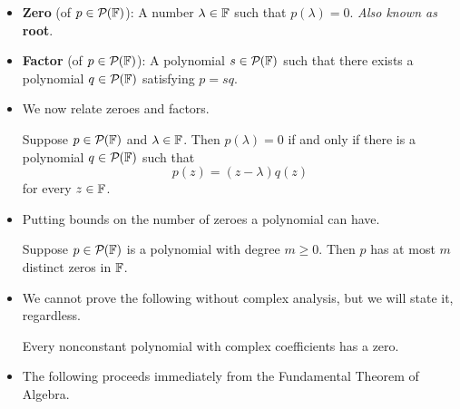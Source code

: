 \documentclass[../main.tex]{subfiles}
\begin{document}
\begin{itemize}
\begin{theorem}
\begin{proof}
\begin{align*}
                \dim\range T &= \dim(\pol[n-m]{\F}\times\pol[m-1]{\F})-\dim\nul T\\
                &= n+1\\
                &= \dim\pol[n]{\F}
            \end{align*}
            Thus, by Exercise \ref{exr:subspaceSameDim}, $\range T=\pol[n]{\F}$. Therefore, since $p\in\pol[n]{\F}$, we know that there exists $q\in\pol[n-m]{\F}$ and $r\in\pol[m-1]{\F}$ such that $p=T(q,r)=sq+r$.\par
            Additionally, we know that $q,r$ are unique: If there exist $q',r'$ such that $T(q',r')=p$, then $T(q-q',r-r')=p-p=0$, implying since $\nul T=\{(0,0)\}$ that $q-q'=0$ and $r-r'=0$, i.e., that $q=q'$ and $r=r'$.
        \end{proof}
    \end{theorem}
    \item \textbf{Zero} (of $p\in\mathcal{P}_{}(\mathbb{F})$): A number $\lambda\in\mathbb{F}$ such that $p(\lambda)=0$. \emph{Also known as} \textbf{root}.
    \item \textbf{Factor} (of $p\in\mathcal{P}_{}(\mathbb{F})$): A polynomial $s\in\mathcal{P}_{}(\mathbb{F})$ such that there exists a polynomial $q\in\mathcal{P}_{}(\mathbb{F})$ satisfying $p=sq$.
    \item We now relate zeroes and factors.
    \begin{theorem}
        Suppose $p\in\mathcal{P}_{}(\mathbb{F})$ and $\lambda\in\mathbb{F}$. Then $p(\lambda)=0$ if and only if there is a polynomial $q\in\mathcal{P}_{}(\mathbb{F})$ such that
        \begin{equation*}
            p(z) = (z-\lambda)q(z)
        \end{equation*}
        for every $z\in\mathbb{F}$.
    \end{theorem}
    \item Putting bounds on the number of zeroes a polynomial can have.
    \begin{theorem}
        Suppose $p\in\mathcal{P}_{}(\mathbb{F})$ is a polynomial with degree $m\geq 0$. Then $p$ has at most $m$ distinct zeros in $\mathbb{F}$.
    \end{theorem}
    \item We cannot prove the following without complex analysis, but we will state it, regardless.
    \begin{theorem}
        Every nonconstant polynomial with complex coefficients has a zero.
    \end{theorem}
    \item The following proceeds immediately from the Fundamental Theorem of Algebra.

\end{itemize}
\end{document}
